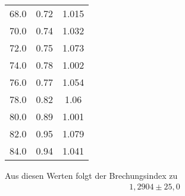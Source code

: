 \begin{table}[H]
\begin{tabular}{c c c}
        68.0  &  0.72  &  1.015  \\
        70.0  &  0.74  &  1.032  \\
        72.0  &  0.75  &  1.073  \\
        74.0  &  0.78  &  1.002  \\
        76.0  &  0.77  &  1.054  \\
        78.0  &  0.82  &  1.06  \\
        80.0  &  0.89  &  1.001  \\
        82.0  &  0.95  &  1.079  \\
        84.0  &  0.94  &  1.041  \\
        \bottomrule
    \end{tabular}
\end{table}

\noindent
Aus diesen Werten folgt der Brechungsindex zu
\begin{align*}
    1,2904 \pm 25,0
\end{align*}